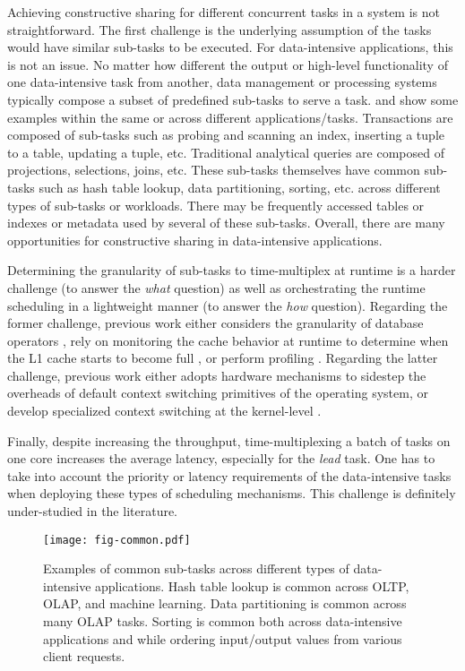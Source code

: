 \documentclass[11pt]{article}
\begin{document}
Achieving constructive sharing for different concurrent tasks in a system is not straightforward.
The first challenge is the underlying assumption of the tasks would have similar sub-tasks to be executed.
For data-intensive applications, this is not an issue.
No matter how different the output or high-level functionality of one data-intensive task from another,
data management or processing systems typically compose a subset of predefined sub-tasks to serve a task.
 and 
show some examples within the same or across different applications/tasks.
Transactions are composed of sub-tasks such as probing and scanning an index,
inserting a tuple to a table, updating a tuple, etc.
Traditional analytical queries are composed of projections, selections, joins, etc.
These sub-tasks themselves have common sub-tasks such as hash table lookup, data partitioning, sorting, etc.
across different types of sub-tasks or workloads.
There may be frequently accessed tables or indexes or metadata used by several of these sub-tasks.
Overall, there are many opportunities for constructive sharing in data-intensive applications.

Determining the granularity of sub-tasks to time-multiplex at runtime is a harder challenge
(to answer the \textit{what} question)
as well as orchestrating the runtime scheduling in a lightweight manner
(to answer the \textit{how} question).
Regarding the former challenge,
previous work either considers the granularity of database operators \cite{HarizopoulosSA05},
rely on monitoring the cache behavior at runtime
to determine when the L1 cache starts to become full \cite{AttaTTAM13},
or perform profiling \cite{HarizopoulosA04}.
Regarding the latter challenge,
previous work either adopts hardware mechanisms \cite{AttaTTAM13}
to sidestep the overheads of default context switching primitives of the operating system,
or develop specialized context switching at the kernel-level \cite{HarizopoulosA04}.

Finally, despite increasing the throughput,
time-multiplexing a batch of tasks on one core increases the average latency,
especially for the \textit{lead} task.
One has to take into account the priority or latency requirements of
the data-intensive tasks when deploying these types of scheduling mechanisms.
This challenge is definitely under-studied in the literature.

\begin{figure}
\centering
\texttt{[image: fig-common.pdf]}
\caption{Examples of common sub-tasks across different types of data-intensive applications.
Hash table lookup is common across OLTP, OLAP, and machine learning.
Data partitioning is common across many OLAP tasks.
Sorting is common both across data-intensive applications and
while ordering input/output values from various client requests.}
\label{fig:common}
\end{figure}
\end{document}
